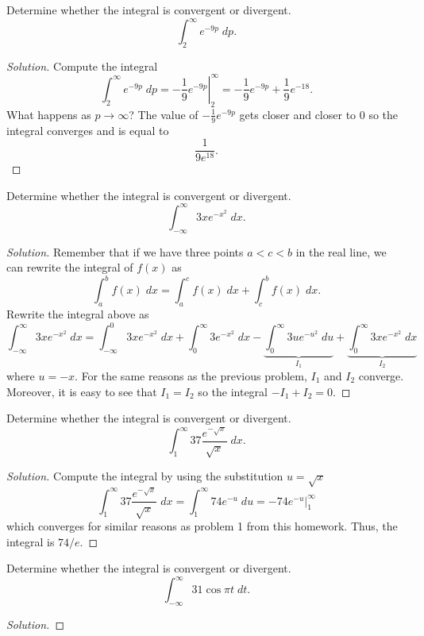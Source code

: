 \begin{problem}[WebAssign, HW 16, \# 2]
Determine whether the integral is convergent or divergent.
\[
\int_2^{\infty} e^{-9p}\;dp.
\]
\end{problem}
\begin{proof}[Solution]
Compute the integral
\[
\int_2^\infty
e^{-9p}\;dp=\left.-\frac{1}{9}e^{-9p}\right|_2^\infty=-\frac{1}{9}e^{-9p}+\frac{1}{9}e^{-18}.
\]
What happens as $p\to\infty$? The value of $-\frac{1}{9}e^{-9p}$ gets
closer and closer to $0$ so the integral converges and is equal to
\[
\boxed{\frac{1}{9e^{18}}.}
\]
\end{proof}

\begin{problem}[WebAssign, HW 16, \# 3]
Determine whether the integral is convergent or divergent.
\[
\int_{-\infty}^\infty 3xe^{-x^2}\;dx.
\]
\end{problem}
\begin{proof}[Solution]
Remember that if we have three points $a<c<b$ in the real line, we can
rewrite the integral of $f(x)$ as
\begin{equation}
  \label{eq:integral-midpoint}
\int_a^b f(x)\;dx=\int_a^cf(x)\;dx+\int_c^bf(x)\;dx.
\end{equation}
Rewrite the integral above as
\[
\int_{-\infty}^\infty 3xe^{-x^2}\;dx=
\int_{-\infty}^0 3xe^{-x^2}\;dx+\int_0^\infty 3e^{-x^2}\;dx
-\underbrace{\int_0^\infty 3ue^{-u^2}\;du}_{I_1}+\underbrace{\int_0^\infty
  3xe^{-x^2}\;dx}_{I_2}
\]
where $u=-x$. For the same reasons as the previous problem, $I_1$ and $I_2$
converge. Moreover, it is easy to see that $I_1=I_2$ so the integral
$\boxed{-I_1+I_2=0}$.
\end{proof}

\begin{problem}[WebAssign, HW 16, \# 4]
Determine whether the integral is convergent or divergent.
\[
\int_1^\infty 37\frac{e^{-\sqrt{x}}}{\sqrt{x}}\;dx.
\]
\end{problem}
\begin{proof}[Solution]
Compute the integral by using the substitution $u=\sqrt{x}$
\[
\int_1^\infty 37\frac{e^{-\sqrt{x}}}{\sqrt{x}}\;dx
=\int_1^\infty 74e^{-u}\;du
=\left.-74e^{-u}\right|_1^\infty
\]
which converges for similar reasons as problem 1 from this homework. Thus,
the integral is $\boxed{74/e}$.
\end{proof}

\begin{problem}[WebAssign, HW 16, \# 5]
Determine whether the integral is convergent or divergent.
\[
\int_{-\infty}^\infty 31\cos\pi t\;dt.
\]
\end{problem}
\begin{proof}[Solution]
\end{proof}


